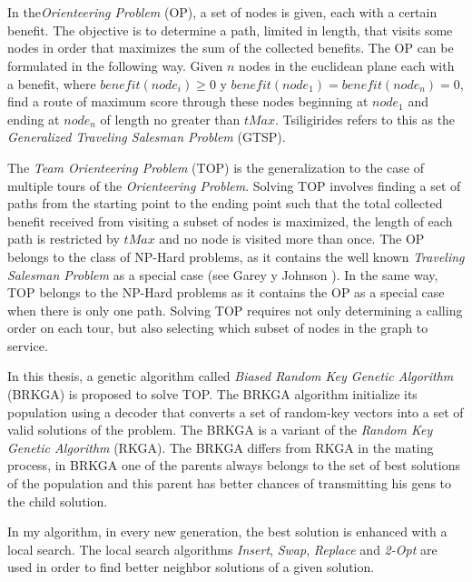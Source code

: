 
\chapter*{\tituloAbstractEn}

\noindent In the\textit{Orienteering Problem} (OP), a set of nodes is given, each with a certain benefit. The objective is to determine a path, limited in length, that visits some nodes in order that maximizes the sum of the collected benefits. The OP can be formulated in the following way. Given $n$ nodes in the euclidean plane each with a benefit, where $benefit(node_i) \geq 0$ y $benefit(node_1) = benefit(node_n) = 0$, find a route of maximum score through these nodes beginning at $node_1$ and ending at $node_n$ of length no greater than $tMax$. Tsiligirides \cite{Tsiligirides} refers to this as the \textit{Generalized Traveling Salesman Problem} (GTSP).

\bigskip

The \textit{Team Orienteering Problem} (TOP) is the generalization to the case of multiple tours of the \textit{Orienteering Problem}. Solving TOP involves finding a set of paths from the starting point to the ending point such that the total collected benefit received from visiting a subset of nodes is maximized, the length of each path is restricted by $tMax$ and no node is visited more than once. The OP belongs to the class of NP-Hard problems, as it contains the well known \textit{Traveling Salesman Problem} as a special case (see Garey y Johnson \cite{GareyJohnson}). In the same way, TOP belongs to the NP-Hard problems as it contains the OP as a special case when there is only one path. Solving TOP requires not only determining a calling order on each tour, but also selecting which subset of nodes in the graph to service.

\bigskip

In this thesis, a genetic algorithm called \textit{Biased Random Key Genetic Algorithm} (BRKGA) is proposed to solve TOP. The BRKGA algorithm initialize its population using a decoder that converts a set of random-key vectors into a set of valid solutions of the problem. The BRKGA is a variant of the \textit{Random Key Genetic Algorithm} (RKGA). The BRKGA differs from RKGA in the mating process, in BRKGA one of the parents always belongs to the set of best solutions of the population and this parent has better chances of transmitting his gens to the child solution.

\bigskip

In my algorithm, in every new generation, the best solution is enhanced with a local search. The local search algorithms \textit{Insert}, \textit{Swap}, \textit{Replace} and \textit{2-Opt}  are used in order to find better neighbor solutions of a given solution.


